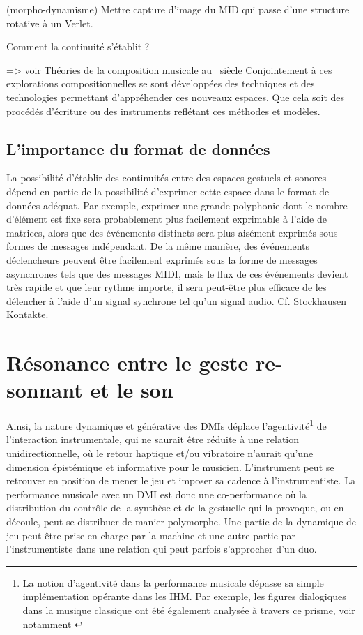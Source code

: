 (morpho-dynamisme)
Mettre capture d'image du MID qui passe d'une structure rotative à un Verlet.

Comment la continuité s'établit ?

=> voir Théories de la composition musicale au ~siècle
Conjointement à ces explorations compositionnelles se sont développées des techniques et des technologies permettant d’appréhender ces nouveaux espaces. Que cela soit des procédés d’écriture ou des instruments reflétant ces méthodes et modèles.

\subsection{L'importance du format de données}
La possibilité d'établir des continuités entre des espaces gestuels et sonores dépend en partie de la possibilité d'exprimer cette espace dans le format de données adéquat. Par exemple, exprimer une grande polyphonie dont le nombre d'élément est fixe sera probablement plus facilement exprimable à l'aide de matrices, alors que des événements distincts sera plus aisément exprimés sous formes de messages indépendant. De la même manière, des événements déclencheurs peuvent être facilement exprimés sous la forme de messages asynchrones tels que des messages MIDI, mais le flux de ces événements devient très rapide et que leur rythme importe, il sera peut-être plus efficace de les délencher à l'aide d'un signal synchrone tel qu'un signal audio. Cf. Stockhausen Kontakte.


\section{Résonance entre le geste re-sonnant et le son}

Ainsi, la nature dynamique et générative des DMIs déplace l'agentivité\footnote{La notion d'agentivité dans la performance musicale dépasse sa simple implémentation opérante dans les IHM. Par exemple, les figures dialogiques dans la musique classique ont été également analysée à travers ce prisme, voir notamment \cite{graybill_whose_2016}} de l'interaction instrumentale, qui ne saurait être réduite à une relation unidirectionnelle, où le retour haptique et/ou vibratoire n'aurait qu'une dimension épistémique et informative pour le musicien.
L'instrument peut se retrouver en position de mener le jeu et imposer sa cadence à l'instrumentiste. La performance musicale avec un \gls{DMI} est donc une co-performance où la distribution du contrôle de la synthèse et de la gestuelle qui la provoque, ou en découle, peut se distribuer de manier polymorphe. Une partie de la dynamique de jeu peut être prise en charge par la machine et une autre partie par l'instrumentiste dans une relation qui peut parfois s'approcher d'un duo.

